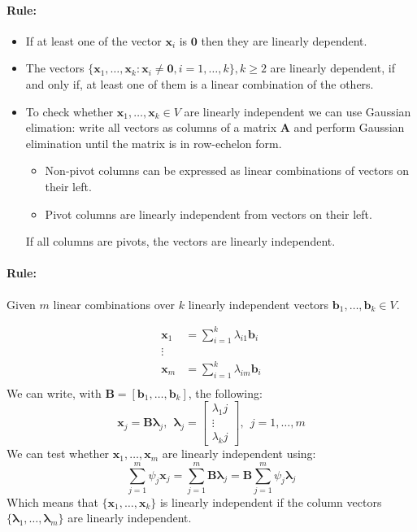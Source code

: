 \documentclass[12pt]{article}
\newcommand{\bx}{{\bm{x}}}
\newcommand{\A}{{\bm{A}}}
\newcommand{\B}{{\bm{B}}}
\newcommand{\vecs}[2]{{\bm{#1}_1, \dots, \bm{#1}_#2}}
\newcommand{\xrule}[1]{\paragraph{\colorbox{#1!30}{\textbf{Rule:}}}}
\begin{document}
\xrule{blue}
%
\begin{itemize}
  \item If at least one of the vector $\bm{x}_i$ is $\bm{0}$ then they are linearly dependent.
  \item The vectors $\{\bx_1, \dots, \bx_k : \bx_i \neq \bm0, i =1, \dots, k\} , k \geqslant 2$ are linearly dependent, if and only if, at least one of them is a linear combination of the others.
  \item To check whether $\bx_1, \dots, \bx_k \in V$ are linearly independent we can use Gaussian elimation: write all vectors as columns of a matrix $\A$ and perform Gaussian elimination until the matrix is in row-echelon form.\begin{itemize}
  \item Non-pivot columns can be expressed as linear combinations of vectors on their left.
  \item Pivot columns are linearly independent from vectors on their left.
	  \end{itemize}
	  If all columns are pivots, the vectors are linearly independent.
\end{itemize}

\xrule{red} Given $m$ linear combinations over $k$ linearly independent vectors $\bm{b}_1, \dots, \bm{b}_k \in V$.

\begin{equation}
	\begin{aligned}
		\bx_1 &= \sum\limits_{i=1}^k \lambda_{i1} \bm{b}_i \\
		\vdots & \\
		\bx_m &= \sum\limits_{i=1}^k \lambda_{im} \bm{b}_i \\
	\end{aligned}
\end{equation}
%
We can write, with $\B = [\bm{b}_1, \dots, \bm{b}_k]$, the following:
%
\begin{equation}
	\bx_j = \bm{B} \bm{\lambda}_j, \ \ \bm{\lambda}_j = \begin{bmatrix}
		\lambda_1j \\
		\vdots \\
		\lambda_kj
	\end{bmatrix}, \ \ j = 1, \dots,m 
\end{equation}
%
We can test whether $\bx_1, \dots, \bx_m$ are linearly independent using:
\begin{equation}
	\sum\limits_{j=1}^m \psi_j \bx_j = \sum\limits_{j=1}^m \B\bm{\lambda}_j = \B \sum\limits_{j=1}^m \psi_j \bm{\lambda}_j
\end{equation}
%
Which means that $\{\vecs{x}{k}\}$ is linearly independent if the column vectors $\{\vecs{\lambda}{m}\}$ are linearly independent.
\end{document}
